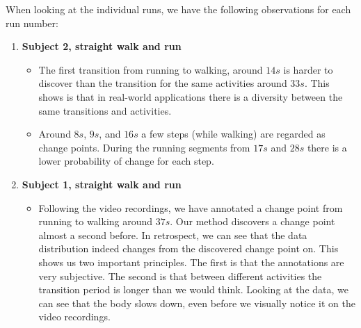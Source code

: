 When looking at the individual runs, we have the following observations for each run number:
\begin{enumerate}
  \item \textbf{Subject 2, straight walk and run} 
    \begin{itemize}
      \item The first transition from running to walking, around $14s$ is harder to discover than the transition for the same activities around $33s$.
      This shows is that in real-world applications there is a diversity between the same transitions and activities.
      \item Around $8s$, $9s$, and $16s$ a few steps (while walking) are regarded as change points.
      During the running segments from $17s$ and $28s$ there is a lower probability of change for each step.
    \end{itemize}
  \item \textbf{Subject 1, straight walk and run} 
    \begin{itemize}
      \item Following the video recordings, we have annotated a change point from running to walking around $37s$.
      Our method discovers a change point almost a second before.
      In retrospect, we can see that the data distribution indeed changes from the discovered change point on.
      This shows us two important principles.
      The first is that the annotations are very subjective.
      The second is that between different activities the transition period is longer than we would think.
      Looking at the data, we can see that the body slows down, even before we visually notice it on the video recordings.
    \end{itemize}


\end{enumerate}
